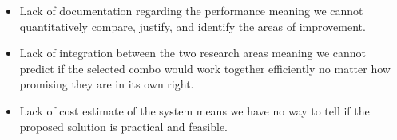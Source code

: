 \documentclass[../thesis.tex]{subfiles}
\begin{document}
\begin{itemize}
\item Lack of documentation regarding the performance meaning we cannot quantitatively compare, justify, and identify the areas of improvement.
\item Lack of integration between the two research areas meaning we cannot predict if the selected combo would work together efficiently no matter how promising they are in its own right.
\item Lack of cost estimate of the system means we have no way to tell if the proposed solution is practical and feasible.
\end{itemize}
\end{document}
